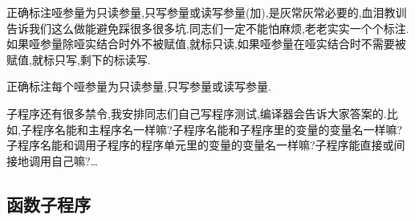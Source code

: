 正确标注哑参量为只读参量,只写参量或读写参量\label{arguments}(加),是灰常灰常必要的,血泪教训告诉我们这么做能避免踩很多很多坑.同志们一定不能怕麻烦,老老实实一个个标注.如果哑参量除哑实结合时外不被赋值,就标只读,如果哑参量在哑实结合时不需要被赋值,就标只写,剩下的标读写.

\begin{convention}
    正确标注每个哑参量为只读参量,只写参量或读写参量.
\end{convention}

子程序还有很多禁令,我安排同志们自己写程序测试,编译器会告诉大家答案的.比如,子程序名能和主程序名一样嘛?子程序名能和子程序里的变量的变量名一样嘛?子程序名能和调用子程序的程序单元里的变量的变量名一样嘛?子程序能直接或间接地调用自己嘛?\dots

\subsection{函数子程序}

